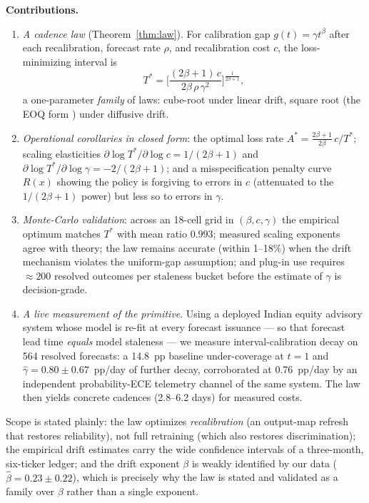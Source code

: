 \documentclass[conference]{IEEEtran}
\begin{document}
\textbf{Contributions.}
\begin{enumerate}
\item \emph{A cadence law} (Theorem~\ref{thm:law}). For calibration gap
$g(t)=\gamma t^{\beta}$ after each recalibration, forecast rate $\rho$, and
recalibration cost $c$, the loss-minimizing interval is
\[
T^{*}=\Big[\frac{(2\beta+1)\,c}{2\beta\,\rho\,\gamma^{2}}\Big]^{\frac{1}{2\beta+1}},
\]
a one-parameter \emph{family} of laws: cube-root under linear drift, square
root (the EOQ form \cite{harris1913}) under diffusive drift.
\item \emph{Operational corollaries in closed form}: the optimal loss rate
$A^{*}=\frac{2\beta+1}{2\beta}\,c/T^{*}$; scaling elasticities
$\partial\log T^{*}/\partial\log c = 1/(2\beta+1)$ and
$\partial\log T^{*}/\partial\log\gamma=-2/(2\beta+1)$; and a misspecification
penalty curve $R(x)$ showing the policy is forgiving to errors in $c$
(attenuated to the $1/(2\beta+1)$ power) but less so to errors in $\gamma$.
\item \emph{Monte-Carlo validation}: across an 18-cell grid in
$(\beta,c,\gamma)$ the empirical optimum matches $T^{*}$ with mean ratio
$0.993$; measured scaling exponents agree with theory; the law remains
accurate (within 1--18\%) when the drift mechanism violates the uniform-gap
assumption; and plug-in use requires $\approx200$ resolved outcomes per
staleness bucket before the estimate of $\gamma$ is decision-grade.
\item \emph{A live measurement of the primitive}. Using a deployed Indian
equity advisory system whose model is re-fit at every forecast issuance ---
so that forecast lead time \emph{equals} model staleness --- we measure
interval-calibration decay on 564 resolved forecasts: a 14.8~pp baseline
under-coverage at $t{=}1$ and $\hat\gamma = 0.80\pm0.67$~pp/day of further
decay, corroborated at 0.76~pp/day by an independent probability-ECE
telemetry channel of the same system. The law then yields concrete cadences
(2.8--6.2 days) for measured costs.
\end{enumerate}

Scope is stated plainly: the law optimizes \emph{recalibration} (an
output-map refresh that restores reliability), not full retraining
(which also restores discrimination); the empirical drift estimates carry the
wide confidence intervals of a three-month, six-ticker ledger; and the drift
exponent $\beta$ is weakly identified by our data ($\hat\beta=0.23\pm0.22$),
which is precisely why the law is stated and validated as a family over
$\beta$ rather than a single exponent.
\end{document}
